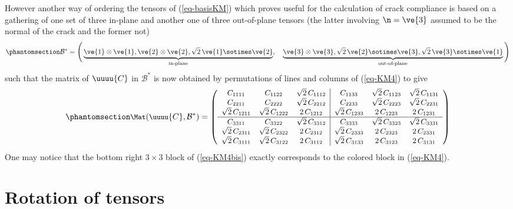 \documentclass[
  letterpaper,
  DIV=11,
  numbers=noendperiod]{scrreprt}
\begin{document}
However another way of ordering the tensors of (\ref{eq-basisKM}) which
proves useful for the calculation of crack compliance is based on a
gathering of one set of three in-plane and another one of three
out-of-plane tensors (the latter involving \(\n=\ve{3}\) assumed to be
the normal of the crack and the former not)
\begin{equation}\phantomsection\label{eq-basisKM2}{
\mathcal{B}^*=\Bigg(
\underbrace{
\ve{1}\otimes\ve{1},
\ve{2}\otimes\ve{2},
\sqrt{2}\,\ve{1}\sotimes\ve{2}
}_{\textrm{in-plane}},
\quad
\underbrace{
\ve{3}\otimes\ve{3},
\sqrt{2}\,\ve{2}\sotimes\ve{3},
\sqrt{2}\,\ve{3}\sotimes\ve{1}
}_{\textrm{out-of-plane}}
\Bigg)
}\end{equation} such that the matrix of \(\uuuu{C}\) in
\(\mathcal{B}^*\) is now obtained by permutations of lines and columns
of (\ref{eq-KM4}) to give
\begin{equation}\phantomsection\label{eq-KM4bis}{
\small
\Mat(\uuuu{C},\mathcal{B}^*)=
   \left(
   \begin{array}{ccc|ccc}
   C_{1111} & C_{1122} & \sqrt{2}\,C_{1112} & C_{1133} & \sqrt{2}\,C_{1123} & \sqrt{2}\,C_{1131} \\
   C_{2211} & C_{2222} & \sqrt{2}\,C_{2212} & C_{2233} & \sqrt{2}\,C_{2223} & \sqrt{2}\,C_{2231} \\
   \sqrt{2}\,C_{1211} & \sqrt{2}\,C_{1222} & 2\,C_{1212} & \sqrt{2}\,C_{1233} & 2\,C_{1223} & 2\,C_{1231} \\
   \hline
   C_{3311} & C_{3322} & \sqrt{2}\,C_{3312} & C_{3333} & \sqrt{2}\,C_{3323} & \sqrt{2}\,C_{3331} \\
   \sqrt{2}\,C_{2311} & \sqrt{2}\,C_{2322} & 2\,C_{2312} & \sqrt{2}\,C_{2333} & 2\,C_{2323} & 2\,C_{2331} \\
   \sqrt{2}\,C_{3111} & \sqrt{2}\,C_{3122} & 2\,C_{3112} & \sqrt{2}\,C_{3133} & 2\,C_{3123} & 2\,C_{3131}
   \end{array}
   \right)
}\end{equation} One may notice that the bottom right \(3\times 3\) block
of (\ref{eq-KM4bis}) exactly corresponds to the colored block in
(\ref{eq-KM4}).

\section{Rotation of tensors}\label{sec-rottens}
\end{document}
